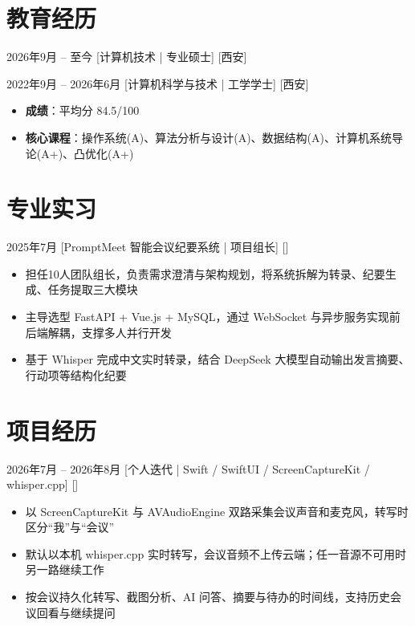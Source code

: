 \documentclass{cv}
\begin{document}
\begin{basicinfo}
\end{basicinfo}

\section{教育经历}
  {2026年9月 -- 至今}
  [计算机技术 | 专业硕士]
  [西安]

  {2022年9月 -- 2026年6月}
  [计算机科学与技术 | 工学学士]
  [西安]
  \begin{itemize}
    \item \textbf{成绩}：平均分 84.5/100
    \item \textbf{核心课程}：操作系统(A)、算法分析与设计(A)、数据结构(A)、计算机系统导论(A+)、凸优化(A+)
  \end{itemize}

\section{专业实习}
  {2025年7月}
  [PromptMeet 智能会议纪要系统 | 项目组长]
  []
  \begin{itemize}
    \item 担任10人团队组长，负责需求澄清与架构规划，将系统拆解为转录、纪要生成、任务提取三大模块
    \item 主导选型 FastAPI + Vue.js + MySQL，通过 WebSocket 与异步服务实现前后端解耦，支撑多人并行开发
    \item 基于 Whisper 完成中文实时转录，结合 DeepSeek 大模型自动输出发言摘要、行动项等结构化纪要
  \end{itemize}

\section{项目经历}
  {2026年7月 -- 2026年8月}
  [个人迭代 | Swift / SwiftUI / ScreenCaptureKit / whisper.cpp]
  []
  \begin{itemize}
    \item 以 ScreenCaptureKit 与 AVAudioEngine 双路采集会议声音和麦克风，转写时区分“我”与“会议”
    \item 默认以本机 whisper.cpp 实时转写，会议音频不上传云端；任一音源不可用时另一路继续工作
    \item 按会议持久化转写、截图分析、AI 问答、摘要与待办的时间线，支持历史会议回看与继续提问
  \end{itemize}
\end{document}
